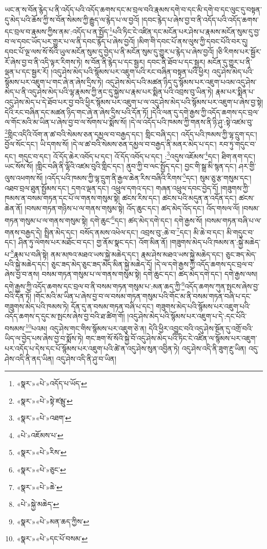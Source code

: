 ཡང་ན་ས་བོན་རྙེད་པ་ནི་འདོད་པའི་འདོད་ཆགས་དང་མ་བྲལ་བའི་རྣམས་དགེ་བ་དང་མི་དགེ་བ་དང་ལུང་དུ་བསྟན་དུ་མེད་པའི་ཆོས་ཀྱི་ས་བོན་སེམས་ཀྱི་རྒྱུད་ལ་རྙེད་པ་ལ་བྱའོ། །དབང་རྙེད་པ་ཞེས་བྱ་བ་ནི་འདོད་པའི་འདོད་ཆགས་དང་བྲལ་བ་རྣམས་ཀྱིས་ནམ་:འདོད་པ་ན་སྤྱོད་\footnote{«སྣར་»«པེ་»འདོད་པ་ཡོད་}པའི་ཏིང་ངེ་འཛིན་དང་མངོན་པར་ཤེས་པ་རྣམས་མངོན་སུམ་དུ་བྱ་བ་ལ་དབང་ཡོད་པར་གྱུར་པ་ལ་ནི་དབང་རྙེད་པ་ཞེས་བྱའོ། །མིག་གི་དབང་པོ་ནས་ལུས་ཀྱི་དབང་པོའི་བར་དུ། དབང་པོ་ལྔ་ལས་སོ་སོའི་ཡུལ་མངོན་སུམ་དུ་བྱེད་པ་ནི་མངོན་སུམ་དུ་གྱུར་པ་རྙེད་པ་ཞེས་བྱའོ། །ཅི་རིགས་པར་སྦྱོར་རོ་ཞེས་བྱ་བ་ནི་འདི་ལྟར་རིགས་ཏེ། ས་བོན་ནི་རྙེད་པ་དང་སྦྱར། དབང་ནི་ཐོབ་པ་དང་སྦྱར། མངོན་དུ་གྱུར་པ་ནི་ལྡན་པ་དང་སྦྱར་རོ། །འདུ་ཤེས་མེད་པའི་སྙོམས་པར་འཇུག་པའི་རང་བཞིན་བསྟན་པའི་ཕྱིར། འདུ་ཤེས་མེད་པའི་སྙོམས་པར་འཇུག་པ་གང་ཞེ་ན་ཞེས་དྲིས་ཏེ། འདུ་ཤེས་མེད་པའི་མཚན་ཉིད་དུ་སྙོམས་པར་འཇུག་པའམ་འདུ་ཤེས་མེད་པ་ནི་འདུ་ཤེས་མེད་པའི་ལྷ་རྣམས་ཀྱི་ནང་དུ་སྐྱེས་པ་རྣམ་པར་སྨིན་པའི་འབྲས་བུ་ཡིན་ཏེ། རྣམ་པར་སྨིན་པ་འདུ་ཤེས་མེད་པ་དེ་ཐོབ་པར་བྱ་བའི་ཕྱིར་སྙོམས་པར་འཇུག་པ་ལ་འདུ་ཤེས་མེད་པའི་སྙོམས་པར་འཇུག་པ་ཞེས་བྱ་སྟེ། དེའི་རང་བཞིན་དང་མཚན་ཉིད་གང་ཞེ་ན་ཞེས་དྲིས་པའི་དོན་ཏོ། །དེའི་ལན་དུ་དགེ་རྒྱས་ཀྱི་འདོད་ཆགས་དང་བྲལ་ལ་གོང་མའི་མ་ཡིན་པ་ཞེས་བྱ་བ་ལ་སོགས་པ་སྨོས་སོ། །དེ་ལ་འདོད་པའི་ཁམས་ཀྱི་གནས་ནི་ཉི་ཤུ་:སྟེ་འཛམ་བུ་\footnote{«སྣར་»«པེ་»སྟེ་ཛམྦུ་}གླིང་འདིའི་འོག་ན་ཚ་བའི་སེམས་ཅན་དམྱལ་བ་བརྒྱད་དང་། གླིང་བཞི་དང་། འདོད་པའི་ཁམས་ཀྱི་ལྷ་དྲུག་དང་། བྱོལ་སོང་དང་། ཡི་དགས་སོ། །དེ་ལ་ཚ་བའི་སེམས་ཅན་དམྱལ་བ་བརྒྱད་ནི་མནར་མེད་པ་དང་། རབ་ཏུ་གདུང་བ་དང་། གདུང་བ་དང་། འོ་དོད་ཆེར་འབོད་པ་དང་། འོ་དོད་འབོད་པ་དང་། :\footnote{«སྣར་»«པེ་»འཐག་}འདུས་འཇོམས་\footnote{«པེ་»འཇོམས་པ་}དང་། ཐིག་ནག་དང་། ཡང་སོས་སོ། །གླིང་བཞི་ནི་ལྷོའི་འཛམ་བུའི་གླིང་དང་། ནུབ་ཀྱི་བ་ལང་སྤྱོད་དང་། བྱང་གི་སྒྲ་མི་སྙན་དང་། ཤར་གྱི་ལུས་འཕགས་སོ། །འདོད་པའི་ཁམས་ཀྱི་ལྷ་དྲུག་ནི་རྒྱལ་ཆེན་རིས་བཞིའི་རིགས་\footnote{«སྣར་»«པེ་»རིས་}དང་། སུམ་ཅུ་རྩ་གསུམ་དང་། འཐབ་བྲལ་ཐུན་སྤྱོམས་དང་། དགའ་ལྡན་དང་། འཕྲུལ་དགའ་དང་། གཞན་འཕྲུལ་དབང་བྱེད་དོ། །གཟུགས་ཀྱི་ཁམས་ན་བསམ་གཏན་དང་པོ་ལ་གནས་གསུམ་སྟེ། ཚངས་རིས་དང་། ཚངས་པའི་མདུན་ན་འདོན་དང་། ཚངས་ཆེན་ནོ། །བསམ་གཏན་གཉིས་པ་ལ་གནས་གསུམ་སྟེ། འོད་ཆུང་དང་། ཚད་མེད་འོད་དང་། འོད་གསལ་ལོ། །བསམ་གཏན་གསུམ་པ་ལ་གནས་གསུམ་སྟེ། དགེ་ཆུང་\footnote{«སྣར་»«པེ་»ཅུང་}དང་། ཚད་མེད་དགེ་དང་། དགེ་རྒྱས་སོ། །བསམ་གཏན་བཞི་པ་ལ་གནས་བརྒྱད་དེ། སྤྲིན་མེད་དང་། བསོད་ནམས་འཕེལ་དང་། འབྲས་བུ་:ཆེ་བ་\footnote{«སྣར་»«པེ་»ཆེ་}དང་། མི་ཆེ་བ་དང་། མི་གདུང་བ་དང་། ཤིན་ཏུ་ལེགས་པར་མཐོང་བ་དང་། གྱ་ནོམ་སྣང་དང་། འོག་མིན་ནོ། །གཟུགས་མེད་པའི་ཁམས་ན་:སྐྱེ་མཆེད་པ་\footnote{«པེ་»སྐྱེ་མཆེད་}རྣམ་པ་བཞི་སྟེ། ནམ་མཁའ་མཐའ་ཡས་སྐྱེ་མཆེད་དང་། རྣམ་ཤེས་མཐའ་ཡས་སྐྱེ་མཆེད་དང་། ཅུང་ཟད་མེད་པའི་སྐྱེ་མཆེད་དང་། ཅུང་ཟད་མེད་ཅུང་ཟད་མེད་མིན་སྐྱེ་མཆེད་དོ། །དེ་ལ་དགེ་རྒྱས་ཀྱི་འདོད་ཆགས་དང་བྲལ་བ་ཞེས་བྱ་བ་ནས། བསམ་གཏན་གསུམ་པ་ལ་གནས་གསུམ་སྟེ། དགེ་ཆུང་དང་། ཚད་མེད་དགེ་དང་། དགེ་རྒྱས་ལས། དགེ་རྒྱས་ཀྱི་འདོད་ཆགས་དང་བྲལ་བ་ནི་བསམ་གཏན་གསུམ་པ་:མན་ཆད་ཀྱི་\footnote{«སྣར་»«པེ་»མན་ཆད་ཀྱིས་}འདོད་ཆགས་ཀུན་སྤངས་ཞེས་བྱ་བའི་དོན་ཏོ། །གོང་མའི་མ་ཡིན་པ་ཞེས་བྱ་བ་ལ་བསམ་གཏན་གསུམ་པའི་གོང་མ་ནི་བསམ་གཏན་བཞི་པ་དང་གཟུགས་མེད་པའི་ཁམས་ཏེ། དོན་དུ་ན་བསམ་གཏན་བཞི་པ་དང་། གཟུགས་མེད་པའི་སྙོམས་པར་འཇུག་པའི་འདོད་ཆགས་ད་དུང་མ་སྤངས་ཞེས་བྱ་བའི་ཐ་ཚིག་གོ། །འདུ་ཤེས་མེད་པའི་སྙོམས་པར་འཇུག་པ་དེ་:དང་པོའི་བསམས་\footnote{«སྣར་»«པེ་»དང་པོ་བསམ་}པའམ། འདུ་ཤེས་གང་གིས་སྙོམས་པར་འཇུག་ཅེ་ན། དེའི་ཕྱིར་འབྱུང་བའི་འདུ་ཤེས་སྔོན་དུ་འགྲོ་བའི་ཡིད་ལ་བྱེད་པས་ཞེས་བྱ་བ་སྨོས་ཏེ། གང་ཟག་སོ་སོའི་སྐྱེ་བོ་འདུ་ཤེས་མེད་པའི་ཏིང་ངེ་འཛིན་ལ་སྙོམས་པར་འཇུག་པར་འདོད་པ་དེས་དང་པོ་སྙོམས་པར་འཇུག་པའི་ཚེ་ན་འདུ་ཤེས་སུན་འབྱིན་ཏེ། འདུ་ཤེས་འདི་ནི་ཟུག་རྔུ་ཡིན། འདུ་ཤེས་འདི་ནི་ནད་ཡིན། འདུ་ཤེས་འདི་ནི་ཤུ་བ་ཡིན། 